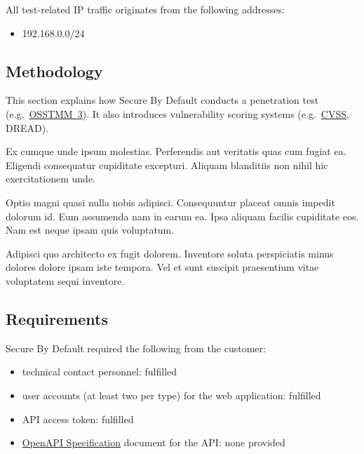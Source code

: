 \documentclass[a4paper]{article}
\newcommand{\passthrough}[1]{\colorbox{code}{\lstset{mathescape=false}#1}}
\begin{document}
All test-related IP traffic originates from the following addresses:

\begin{itemize}
  \item \passthrough{192.168.0.0/24}
\end{itemize}

\subsection{Methodology}

This section explains how Secure By Default conducts a penetration test
(e.g.\ \href{https://www.isecom.org/OSSTMM.3.pdf}{OSSTMM~3}).
It also introduces vulnerability scoring systems (e.g.\ \href{https://www.first.org/cvss/v3.1/specification-document}{CVSS}, DREAD).

Ex cumque unde ipsum molestias.
Perferendis aut veritatis quas cum fugiat ea.
Eligendi consequatur cupiditate excepturi.
Aliquam blanditiis non nihil hic exercitationem unde.

Optio magni quasi nulla nobis adipisci.
Consequuntur placeat omnis impedit dolorum id.
Eum assumenda nam in earum ea.
Ipsa aliquam facilis cupiditate eos.
Nam est neque ipsam quis voluptatum.

Adipisci quo architecto ex fugit dolorem.
Inventore soluta perspiciatis minus dolores dolore ipsam iste tempora.
Vel et sunt suscipit praesentium vitae voluptatem sequi inventore.

  \subsection{Requirements}

  Secure By Default required the following from the customer:

  \begin{itemize}
          \item technical contact personnel: fulfilled

          \item user accounts (at least two per type) for the web application: fulfilled

          \item API access token: fulfilled

          \item \href{https://www.openapis.org/}{OpenAPI Specification} document for the API: none provided

      \end{itemize}
\end{document}
